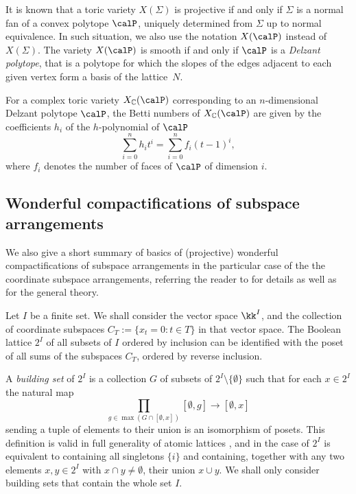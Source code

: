It is known that a toric variety $X(\Sigma)$ is projective if and only if $\Sigma$ is a normal fan of a convex polytope $\calP$, uniquely determined from $\Sigma$ up to normal equivalence. In such situation, we also use the notation $X(\calP)$ instead of $X(\Sigma)$. The variety $X(\calP)$ is smooth if and only if $\calP$ is a \emph{Delzant polytope}, that is a polytope for which the slopes of the edges adjacent to each given vertex form a basis of the lattice~$N$. 

For a complex toric variety $X_{\mathbb{C}}(\calP)$ corresponding to an $n$-dimensional Delzant polytope $\calP$, the Betti numbers of $X_{\mathbb{C}}(\calP)$ are given by the coefficients $h_i$ of the $h$-polynomial of $\calP$ 
 \[
\sum_{i=0}^n h_it^i=\sum_{i=0}^n f_i(t-1)^i,   
 \]
where $f_i$ denotes the number of faces of $\calP$ of dimension $i$.


\subsection{Wonderful compactifications of subspace arrangements}\label{sec:rec-wond}

We also give a short summary of basics of (projective) wonderful compactifications of subspace arrangements in the particular case of the the coordinate subspace arrangements, referring the reader to \cite{MR1366622,MR2038195,MR2746338} for details as well as for the general theory.

Let $I$ be a finite set. We shall consider the vector space $\kk^I$, and the collection of coordinate subspaces $C_T:=\{x_t=0\colon t\in T\}$ in that vector space. The Boolean lattice $2^I$ of all subsets of $I$ ordered by inclusion can be identified with the poset of all sums of the subspaces $C_T$, ordered by reverse inclusion. 

A \emph{building set} of $2^I$ is a collection $G$ of subsets of $2^I\setminus\{\emptyset\}$ such that for each $x\in 2^I$ the natural map
 \[
\prod_{g\in \max(G\cap [\emptyset,x])}[\emptyset,g]\to 
[\emptyset,x]
 \]
sending a tuple of elements to their union is an isomorphism of posets. This definition is valid in full generality of atomic lattices \cite{MR2038195}, and in the case of $2^I$ is equivalent to containing all singletons $\{i\}$ and containing, together with any two elements $x,y\in 2^I$ with $x\cap y\ne\emptyset$, their union $x\cup y$. We shall only consider building sets that contain the whole set $I$.

